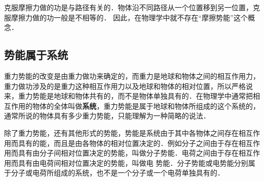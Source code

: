 克服摩擦力做的功是与路径有关的．物体沿不同路径从一个位置移到另一位置，克服摩擦力做的功一般是不相等的．
因此，在物理学中就不存在“摩擦势能”这个概念．


\subsection{势能属于系统}

重力势能的改变是由重力做功来确定的，而重力是地球和物体之间的相互作用力，重力做功涉及的是重力这种相互作用力以及地球和物体的相对位置，所以严格说来，重力势能是地球和物体共有的，而不是物体单独具有的．在物理学中通常把相互作用的物体的全体叫做\textbf{系统}，重力势能是属于地球和物体所组成的这个系统的，通常所说的物体具有多少重力势能，只能理解为一种简略的说法．

除了重力势能，还有其他形式的势能，势能是系统由于其中各物体之间存在相互作用而具有的能，而且是由各物体的相对位置决定的．例如分子之间由于存在相互作用而具有由分子间相对位置决定的势能，叫做分子势能．电荷之间由于存在相互作用而具有由电荷间相对位置决定的势能，叫做电
势能．分子势能或电势能分别属于分子或电荷所组成的系统，也不是一个分子或一个电荷单独具有的．

